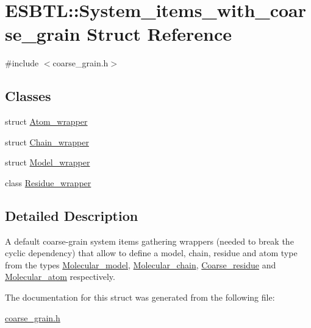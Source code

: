 \hypertarget{structESBTL_1_1System__items__with__coarse__grain}{}\section{E\+S\+B\+TL\+:\+:System\+\_\+items\+\_\+with\+\_\+coarse\+\_\+grain Struct Reference}
\label{structESBTL_1_1System__items__with__coarse__grain}


{\ttfamily \#include $<$coarse\+\_\+grain.\+h$>$}

\subsection*{Classes}
\begin{DoxyCompactItemize}
\item 
struct \hyperlink{structESBTL_1_1System__items__with__coarse__grain_1_1Atom__wrapper}{Atom\+\_\+wrapper}
\item 
struct \hyperlink{structESBTL_1_1System__items__with__coarse__grain_1_1Chain__wrapper}{Chain\+\_\+wrapper}
\item 
struct \hyperlink{structESBTL_1_1System__items__with__coarse__grain_1_1Model__wrapper}{Model\+\_\+wrapper}
\item 
class \hyperlink{classESBTL_1_1System__items__with__coarse__grain_1_1Residue__wrapper}{Residue\+\_\+wrapper}
\end{DoxyCompactItemize}


\subsection{Detailed Description}
A default coarse-\/grain system items gathering wrappers (needed to break the cyclic dependency) that allow to define a model, chain, residue and atom type from the types \hyperlink{classESBTL_1_1Molecular__model}{Molecular\+\_\+model}, \hyperlink{classESBTL_1_1Molecular__chain}{Molecular\+\_\+chain}, \hyperlink{classESBTL_1_1Coarse__residue}{Coarse\+\_\+residue} and \hyperlink{classESBTL_1_1Molecular__atom}{Molecular\+\_\+atom} respectively. 

The documentation for this struct was generated from the following file\+:\begin{DoxyCompactItemize}
\item 
\hyperlink{coarse__grain_8h}{coarse\+\_\+grain.\+h}\end{DoxyCompactItemize}
